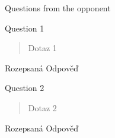 \begin{frame}{Questions from the opponent}
\begin{alertblock}{Question 1}
    \begin{quote}
    Dotaz 1
    \end{quote}
\end{alertblock}

\begin{tcolorbox}%
    Rozepsaná Odpověď
\end{tcolorbox}

\begin{alertblock}{Question 2}
    \begin{quote}
    Dotaz 2
    \end{quote}
\end{alertblock}

\begin{tcolorbox}%
    Rozepsaná Odpověď
\end{tcolorbox}
\end{frame}
